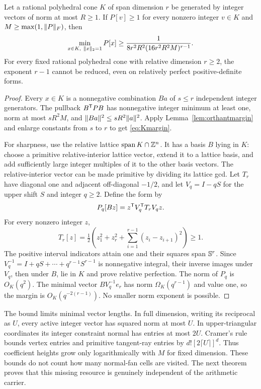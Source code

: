 \begin{theorem}\label{thm:lattice}
Let a rational polyhedral cone $K$ of span dimension $r$ be generated by integer vectors of norm at most $R\ge1$. If $P[v]\ge1$ for every nonzero integer $v\in K$ and $M\ge\max(1,\lVert P\rVert_F)$, then
\begin{equation}\label{eq:Kmargin}
 \min_{x\in K,\ \lVert x\rVert_2=1}P[x]\ge
 \frac1{8r^2R^2(16r^2R^2M)^{r-1}}.
\end{equation}
For every fixed rational polyhedral cone with relative dimension $r\ge2$, the exponent $r-1$ cannot be reduced, even on relatively perfect positive-definite forms.
\end{theorem}
\begin{proof}
Every $x\in K$ is a nonnegative combination $Ba$ of $s\le r$ independent integer generators. The pullback $B^{\mathsf T} PB$ has nonnegative integer minimum at least one, norm at most $sR^2M$, and $\lVert Ba\rVert^2\le sR^2\lVert a\rVert^2$. Apply Lemma~\ref{lem:orthantmargin} and enlarge constants from $s$ to $r$ to get \eqref{eq:Kmargin}.

For sharpness, use the relative lattice $\operatorname{span} K\cap\mathbb Z^n$. It has a basis $B$ lying in $K$: choose a primitive relative-interior lattice vector, extend it to a lattice basis, and add sufficiently large integer multiples of it to the other basis vectors. The relative-interior vector can be made primitive by dividing its lattice gcd. Let $T_r$ have diagonal one and adjacent off-diagonal $-1/2$, and let $V_q=I-qS$ for the upper shift $S$ and integer $q\ge2$. Define the form by
\[
 P_q[Bz]=z^{\mathsf T} V_q^{\mathsf T} T_rV_qz.
\]
For every nonzero integer $z$,
\[
 T_r[z]=\tfrac12\left(z_1^2+z_r^2+\sum_{i=1}^{r-1}(z_i-z_{i+1})^2\right)\ge1.
\]
The positive interval indicators attain one and their squares span $\mathbb S^r$. Since $V_q^{-1}=I+qS+\cdots+q^{r-1}S^{r-1}$ is nonnegative integral, their inverse images under $V_q$, then under $B$, lie in $K$ and prove relative perfection. The norm of $P_q$ is $O_K(q^2)$. The minimal vector $BV_q^{-1}e_r$ has norm $\Omega_K(q^{r-1})$ and value one, so the margin is $O_K(q^{-2(r-1)})$. No smaller norm exponent is possible.
\end{proof}

The bound limits minimal vector lengths. In full dimension, writing its reciprocal as $U$, every active integer vector has squared norm at most $U$. In upper-triangular coordinates its integer constraint normal has entries at most $2U$. Cramer's rule bounds vertex entries and primitive tangent-ray entries by $d![2\lceil U\rceil]^d$. Thus coefficient heights grow only logarithmically with $M$ for fixed dimension. These bounds do not count how many normal-fan cells are visited. The next theorem proves that this missing resource is genuinely independent of the arithmetic carrier.

